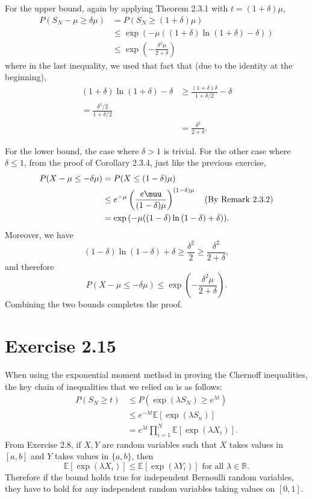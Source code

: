For the upper bound, again by applying Theorem 2.3.1 with $t = (1 + \delta)\mu$, 
\begin{align*}
	P(S_N - \mu \geq \delta \mu) 
	&= P(S_N \geq (1 + \delta)\mu) \\
	&\leq \exp{(-\mu((1 + \delta)\ln{(1 + \delta)} - \delta))} \\
	&\leq \exp{\left( -\frac{\delta^2 \mu}{2 + \delta} \right)}
\end{align*}
where in the last inequality, we used that fact that (due to the identity at the beginning),
\begin{align*}
	(1 + \delta)\ln{(1 + \delta)} - \delta 
	&\geq \frac{(1 + \delta)\delta}{1 + \delta/2} - \delta \\
	= \frac{\delta^2 / 2}{1 + \delta/2} \\
	&= \frac{\delta^2}{2 + \delta}.
\end{align*}

For the lower bound, the case where $\delta > 1$ is trivial. For the other case where $\delta \leq 1$, from 
the proof of Corollary 2.3.4, just like the previous exercise, 
\begin{align*}
	P(X - \mu \leq -\delta \mu) 
	&= P(X \leq (1 - \delta)\mu) \\
	&\leq e^{-\mu} \left( \frac{e \muu}{(1 - \delta)\mu} \right)^{(1 - \delta)\mu} 
	\quad \text{(By Remark 2.3.2)} \\
	&= \exp{(-\mu((1 - \delta)\ln{(1 - \delta)} + \delta))}.
\end{align*}
Moreover, we have
\[ (1 - \delta)\ln{(1 - \delta)} + \delta \geq \frac{\delta^2}{2} \geq \frac{\delta^2}{2 + \delta}, \]
and therefore 
\[ P(X - \mu \leq -\delta \mu) \leq \exp{\left( -\frac{\delta^2 \mu}{2 + \delta} \right)}. \]
Combining the two bounds completes the proof.


\newpage
\section*{Exercise 2.15}
When using the exponential moment method in proving the Chernoff inequalities, the key chain of inequalities 
that we relied on is as follows:
\begin{align*}
	P(S_N \geq t) 
	&\leq P(\exp{(\lambda S_N)} \geq e^{\lambda t}) \\
	&\leq e^{-\lambda t} \mathbb{E}\left[ \exp{(\lambda S_n)} \right] \\
	&= e^{\lambda t} \prod_{i = 1}^{N} \mathbb{E}\left[ \exp{(\lambda X_i)} \right].
\end{align*}
From Exercise 2.8, if $X, Y$ are random variables such that $X$ takes values in $[a, b]$ and $Y$ takes values 
in $\{ a, b \}$, then 
\[ \mathbb{E}\left[ \exp{(\lambda X_i)} \right] \leq \mathbb{E}\left[ \exp{(\lambda Y_i)} \right] 
\text{ for all } \lambda \in \mathbb{R}. \]
Therefore if the bound holds true for independent Bernoulli random variables, they have to hold for any 
independent random variables taking values on $[0, 1]$.


